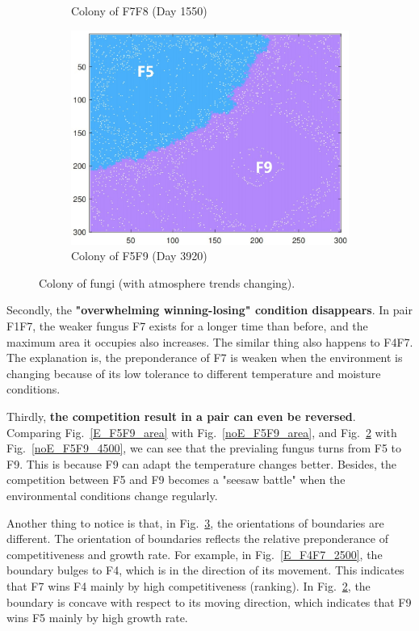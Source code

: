 \documentclass[a4paper,12pt]{article}
\begin{document}
\begin{figure}[H]
\begin{subfigure}{0.3\textwidth}
			\caption{Colony of F7F8 (Day 1550)}
			\label{E_F7F8_1550}
		\end{subfigure}
		\begin{subfigure}{0.3\textwidth}
			\includegraphics[width=\textwidth]{./4/E_F5F9_3920.jpg}
			\caption{Colony of F5F9 (Day 3920)}
			\label{E_F5F9_3920}
		\end{subfigure}
		\caption{Colony of fungi (with atmosphere trends changing).}
		\label{E_colony}
		\end{figure}

\par Secondly, the \textbf{"overwhelming winning-losing" condition disappears}. In pair F1F7, the weaker fungus F7 exists for a longer time than before, and the maximum area it occupies also increases. The similar thing also happens to F4F7. The explanation is, the preponderance of F7 is weaken when the environment is changing because of its low tolerance to different temperature and moisture conditions.
\par Thirdly, \textbf{the competition result in a pair can even be reversed}. Comparing Fig.~\ref{E_F5F9_area} with Fig.~\ref{noE_F5F9_area}, and Fig.~\ref{E_F5F9_3920} with Fig.~\ref{noE_F5F9_4500}, we can see that the previaling fungus turns from F5 to F9. This is because F9 can adapt the temperature changes better. Besides, the competition between F5 and F9 becomes a "seesaw battle" when the environmental conditions change regularly.
\par Another thing to notice is that, in Fig.~\ref{E_colony}, the orientations of boundaries are different. The orientation of boundaries reflects the relative preponderance of competitiveness and growth rate. For example, in Fig.~\ref{E_F4F7_2500}, the boundary bulges to F4, which is in the direction of its movement. This indicates that F7 wins F4 mainly by high competitiveness (ranking). In Fig.~\ref{E_F5F9_3920}, the boundary is concave with respect to its moving direction, which indicates that F9 wins F5 mainly by high growth rate.
\end{document}
